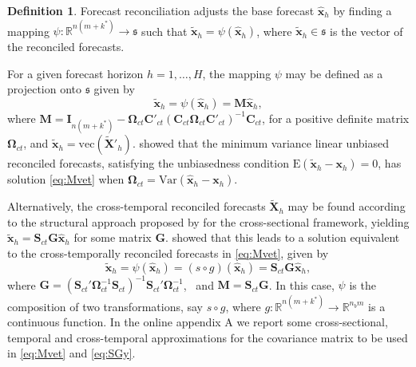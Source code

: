 \documentclass[a4paper,11pt]{article}
\newcommand{\xvet}{\bm{x}}
\newcommand{\Cvet}{\bm{C}}
\newcommand{\Gvet}{\bm{G}}
\newcommand{\Ivet}{\bm{I}}
\newcommand{\Mvet}{\bm{M}}
\newcommand{\Svet}{\bm{S}}
\newcommand{\Xvet}{\bm{X}}
\newcommand{\Omegavet}{\bm{\Omega}}
\theoremstyle{definition}
\newtheorem{definition}{Definition}[section]
\begin{document}
\begin{definition}
	Forecast reconciliation adjusts the base forecast $\widehat{\xvet}_{h}$ by finding a mapping $\psi: \mathbb{R}^{n(m+k^\ast)} \rightarrow \mathfrak{s}$ such that $\widetilde{\xvet}_{h} = \psi\left(\widehat{\xvet}_{h}\right)$, where $\widetilde{\xvet}_{h} \in \mathfrak{s}$ is the vector of the reconciled forecasts.
\end{definition}

For a given forecast horizon $h = 1,\dots, H$, the mapping $\psi$ may be defined as a projection onto $\mathfrak{s}$ given by \citep{panagiotelis2021, difonzo2023}
\begin{equation}
	\label{eq:Mvet}
	\widetilde{\xvet}_{h} = \psi\left(\widehat{\xvet}_h\right) = \Mvet \widehat{\xvet}_h,
\end{equation}
where $\Mvet = \Ivet_{n(m+ k^\ast)} - \Omegavet_{ct}\Cvet'_{ct}\left(\Cvet_{ct}\Omegavet_{ct}\Cvet'_{ct}\right)^{-1}\Cvet_{ct}$, for a positive definite matrix $\Omegavet_{ct}$, and $\widetilde{\xvet}_{h} = \mathrm{vec}(\widetilde{\Xvet}'_{h})$.
\citet{wickramasuriya2019} showed that the minimum variance linear unbiased reconciled forecasts, satisfying the unbiasedness condition $\text{E}(\widetilde{\xvet}_h -\xvet_h) = 0$, has solution \eqref{eq:Mvet} when $\Omegavet_{ct} = \text{Var}(\widehat{\xvet}_h -\xvet_h)$.

Alternatively, the cross-temporal reconciled forecasts $\widetilde{\Xvet}_{h}$ may be found according to the structural approach proposed by \cite{hyndman2011} for the cross-sectional framework, yielding $\widetilde{\xvet}_h = \Svet_{ct}\Gvet \widehat{\xvet}_h$ for some matrix $\Gvet$. \citet{wickramasuriya2019} showed that this leads to a solution equivalent to the cross-temporally reconciled forecasts in \eqref{eq:Mvet}, given by
\begin{equation}\label{eq:SGy}
	\widetilde{\xvet}_{h} = \psi\left(\widehat{\xvet}_h \right) = \left(s \circ g \right)\left(\widehat{\xvet}_h\right)=\Svet_{ct}\Gvet \widehat{\xvet}_{h},
\end{equation}
where $\Gvet = (\Svet_{ct}' \Omegavet_{ct}^{-1}\Svet_{ct})^{-1} \Svet_{ct}'\Omegavet_{ct}^{-1}$,~ and $\Mvet = \Svet_{ct} \Gvet$. In this case, $\psi$ is the composition of two transformations, say $s \circ g$, where $g: \mathbb{R}^{n(m+k^\ast)} \rightarrow \mathbb{R}^{n_b m}$ is a continuous function. In the online appendix A we report some cross-sectional, temporal and cross-temporal approximations for the covariance matrix to be used in \eqref{eq:Mvet} and \eqref{eq:SGy}.
\end{document}
